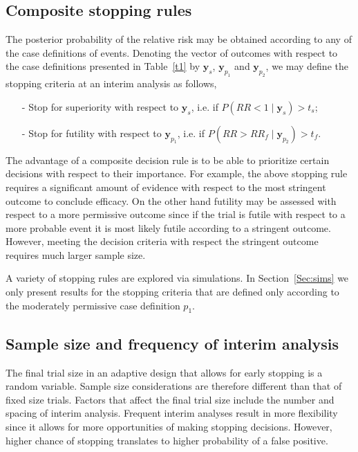 \documentclass[12pt]{article}
\begin{document}
\subsection{Composite stopping rules}
The posterior probability of the relative risk may be obtained according to any of the case definitions of events. Denoting the vector of outcomes with respect to the case definitions presented in Table~\ref{t1} by $\mathbf{y}_s$,  $\mathbf{y}_{p_1}$ and $\mathbf{y}_{p_2}$, we may define the stopping criteria at an interim analysis as follows, 
\begin{itemize}
	\item[-] Stop for superiority with respect to $\mathbf{y}_s$, i.e. if $P(RR<1\mid \mathbf{y}_s)> t_s$;
	\item[-] Stop for futility with respect to $\mathbf{y}_{p_1}$, i.e. if $P(RR> RR_f \mid \mathbf{y}_{p_2})> t_f$.
\end{itemize}
The advantage of a composite decision rule is to be able to prioritize certain decisions with respect to their importance. For example, the above stopping rule requires a significant amount of evidence with respect to the most stringent outcome to conclude efficacy. On the other hand futility may be assessed with respect to a more permissive outcome since if the trial is futile with respect to a more probable event it is most likely futile according to a stringent outcome. However, meeting the decision criteria with respect the stringent outcome requires much larger sample size. 

A variety of stopping rules are explored via simulations. In Section~\ref{Sec:sims} we only present results for the stopping criteria that are defined only according to the moderately permissive case definition $p_1$.

\subsection{Sample size and frequency of interim analysis}
The final trial size in an adaptive design that allows for early stopping is a random variable. Sample size considerations are therefore different than that of fixed size trials. Factors that affect the final trial size include the number and spacing of interim analysis. Frequent interim analyses result in more flexibility since it allows for more opportunities of making stopping decisions. However, higher chance of stopping translates to higher probability of a false positive. 
\end{document}
